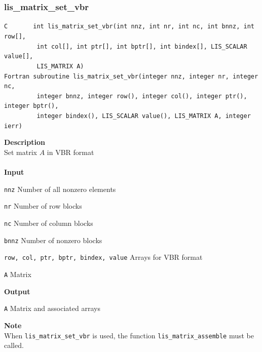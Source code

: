 \documentclass[a4paper]{article}
\newcommand{\namelistlabel}[1]{\mbox{#1}\hfill}
\newenvironment{namelist}[1]{%
 \begin{list}{}
  {\let\makelabel\namelistlabel
  \settowidth{\labelwidth}{#1}
  \setlength{\leftmargin}{1.1\labelwidth}}
}{%
\end{list}}
\begin{document}
  \subsubsection{lis\_matrix\_set\_vbr}
\begin{screen}
\verb|C       int lis_matrix_set_vbr(int nnz, int nr, int nc, int bnnz, int row[],|\\
\verb|         int col[], int ptr[], int bptr[], int bindex[], LIS_SCALAR value[],|\\
\verb|         LIS_MATRIX A)|\\
\verb|Fortran subroutine lis_matrix_set_vbr(integer nnz, integer nr, integer nc,|\\
\verb|         integer bnnz, integer row(), integer col(), integer ptr(), integer bptr(),|\\
\verb|         integer bindex(), LIS_SCALAR value(), LIS_MATRIX A, integer ierr) |
\end{screen}
{\bf Description}\\
\indent
Set matrix $A$ in VBR format
\\ \\
\noindent
{\bf Input}
\begin{namelist}{XXXXXXXXXXXXXXXXXXXX}
\item[\tt nnz] Number of all nonzero elements
\item[\tt nr] Number of row blocks
\item[\tt nc] Number of column blocks
\item[\tt bnnz] Number of nonzero blocks
\item[\tt row, col, ptr, bptr, bindex, value] Arrays for VBR format
\item[\tt A] Matrix
\end{namelist}
{\bf Output}
\begin{namelist}{XXXXXXXXXXXXXXXXXXXX}
\item[\tt A] Matrix and associated arrays
\end{namelist}
\noindent
{\bf Note}\\
\indent
When \verb|lis_matrix_set_vbr| is used, 
the function \verb|lis_matrix_assemble| must be called. 

\end{document}
